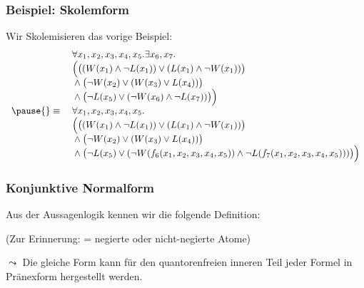 \documentclass[aspectratio=1610,onlymath]{beamer}
\begin{document}
\begin{frame}\frametitle{Beispiel: Skolemform}

Wir Skolemisieren das vorige Beispiel:
\[\begin{array}{rl}
& \forall x_1,x_2,x_3,x_4,x_5.\exists x_6,x_7.\\
& \Big(\big((W(x_1)\wedge\neg L(x_1))\vee (L(x_1)\wedge\neg W(x_1))\big)\\
& {}\wedge{}  \big(\neg W(x_2)\vee(W(x_3) \vee L(x_4))\big)\\
& {}\wedge{}  \big(\neg L(x_5)\vee(\neg W(x_6) \wedge \neg L(x_7))\big)\Big)\\\pause
{}\equiv{} & \forall x_1,x_2,x_3,x_4,x_5.\\
& \Big(\big((W(x_1)\wedge\neg L(x_1))\vee (L(x_1)\wedge\neg W(x_1))\big)\\
& {}\wedge{}  \big(\neg W(x_2)\vee(W(x_3) \vee L(x_4))\big)\\
& {}\wedge{}  \big(\neg L(x_5)\vee(\neg W(f_6(x_1,x_2,x_3,x_4,x_5)) \wedge \neg L(f_7(x_1,x_2,x_3,x_4,x_5)))\big)\Big)
\end{array}
\]


\end{frame}


\begin{frame}\frametitle{Konjunktive Normalform}

Aus der Aussagenlogik kennen wir die folgende Definition:
\bigskip

\medskip

(Zur Erinnerung:  = negierte oder nicht-negierte Atome)
\bigskip

$\leadsto$ Die gleiche Form kann für den quantorenfreien inneren Teil jeder Formel in Pränexform hergestellt werden.

\end{frame}
\end{document}
